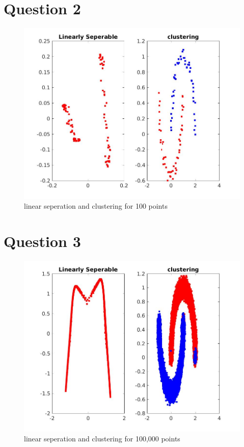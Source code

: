\documentclass{article}
\begin{document}
\section*{Question 2}

\begin{figure}[H]
\centering
\includegraphics[width=1\linewidth]{1e2_points_clustering.jpg}
\caption{linear seperation and clustering for 100 points}
\end{figure}










\section*{Question 3}


\begin{figure}[H]
\centering
\includegraphics[width=1\linewidth]{1e5_points_clustering.jpg}
\caption{linear seperation and clustering for 100,000 points}
\end{figure}
\end{document}
